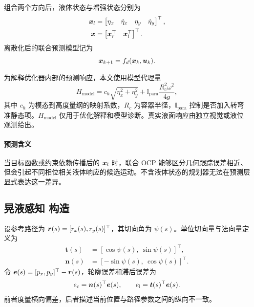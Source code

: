 组合两个方向后，液体状态与增强状态分别为
\begin{equation}
\begin{aligned}
  \bm{x}_{l} &=
  \begin{bmatrix}
    \eta_x & \dot{\eta}_x & \eta_y & \dot{\eta}_y
  \end{bmatrix}^{\top},\\
  \bm{x} &=
  \begin{bmatrix}
    \bm{x}_{r}^{\top} & \bm{x}_{l}^{\top}
  \end{bmatrix}^{\top}.
\end{aligned}
\label{eq:augmented_state}
\end{equation}
离散化后的联合预测模型记为
\begin{equation}
  \bm{x}_{k+1}=f_d(\bm{x}_k,\bm{u}_k).
  \label{eq:augmented_discrete}
\end{equation}

为解释优化器内部的预测响应，本文使用模型代理量
\begin{equation}
  H_{\mathrm{model}}
  =
  c_h\sqrt{\eta_x^2+\eta_y^2}
  +\mathbb{I}_{\mathrm{para}}\frac{R_c^2\omega^2}{4g},
  \label{eq:h_model}
\end{equation}
其中 $c_h$ 为模态到高度量纲的映射系数，$R_c$ 为容器半径，$\mathbb{I}_{\mathrm{para}}$ 控制是否加入转弯准静态项。$H_{\mathrm{model}}$ 仅用于优化解释和模型诊断。真实液面响应由独立视觉或液位观测给出。

\paragraph{预测含义}
当目标函数或约束依赖传播后的 $\bm{x}_{l}$ 时，联合 OCP 能够区分几何跟踪误差相近、但会引起不同相位相关液体响应的候选运动。不含液体状态的规划器无法在预测层显式表达这一差异。

\subsection{晃液感知 \MPCC{} 构造}

设参考路径为 $\bm{r}(s)=[r_x(s),r_y(s)]^{\top}$，其切向角为 $\psi(s)$。单位切向量与法向量定义为
\begin{equation}
\begin{aligned}
  \bm{t}(s) &= [\cos\psi(s),\ \sin\psi(s)]^{\top},\\
  \bm{n}(s) &= [-\sin\psi(s),\ \cos\psi(s)]^{\top}.
\end{aligned}
\end{equation}
令 $\bm{e}(s)=[p_x,p_y]^{\top}-\bm{r}(s)$，轮廓误差和滞后误差为
\begin{equation}
  e_{\mathrm{c}}=\bm{n}(s)^{\top}\bm{e}(s),\qquad
  e_{\mathrm{l}}=\bm{t}(s)^{\top}\bm{e}(s).
  \label{eq:contour_lag_error}
\end{equation}
前者度量横向偏差，后者描述当前位置与路径参数之间的纵向不一致。

